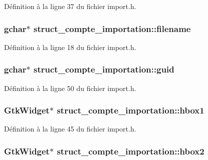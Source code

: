 Définition à la ligne 37 du fichier import.h.

\subsubsection[{filename}]{\setlength{\rightskip}{0pt plus 5cm}gchar$\ast$ {\bf struct\_\-compte\_\-importation::filename}}\label{structstruct__compte__importation_a251887d1a77ba7cd4cb99759fc1e9bed}


Définition à la ligne 18 du fichier import.h.

\subsubsection[{guid}]{\setlength{\rightskip}{0pt plus 5cm}gchar$\ast$ {\bf struct\_\-compte\_\-importation::guid}}\label{structstruct__compte__importation_a4804c10f65cebad7f81555409a3f89c4}


Définition à la ligne 50 du fichier import.h.

\subsubsection[{hbox1}]{\setlength{\rightskip}{0pt plus 5cm}GtkWidget$\ast$ {\bf struct\_\-compte\_\-importation::hbox1}}\label{structstruct__compte__importation_a5bf56c845b4b614f2ff708a93725ca28}


Définition à la ligne 45 du fichier import.h.

\subsubsection[{hbox2}]{\setlength{\rightskip}{0pt plus 5cm}GtkWidget$\ast$ {\bf struct\_\-compte\_\-importation::hbox2}}\label{structstruct__compte__importation_a2fcc401a65dab09ef1c70e95a86371a7}


